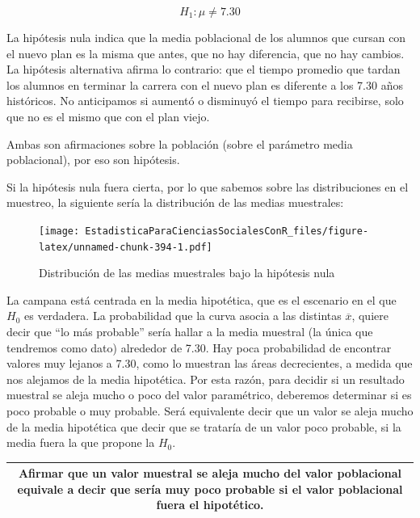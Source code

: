 \documentclass[]{book}
\begin{document}
\[H_{1}:\mu \neq 7.30\]

La hipótesis nula indica que la media poblacional de los alumnos que
cursan con el nuevo plan es la misma que antes, que no hay diferencia,
que no hay cambios. La hipótesis alternativa afirma lo contrario: que el tiempo promedio que tardan los alumnos en terminar la carrera con el
nuevo plan es diferente a los 7.30 años históricos. No anticipamos si aumentó o disminuyó el tiempo para recibirse, solo que no es el mismo que con el plan viejo.

Ambas son afirmaciones sobre la población (sobre el parámetro media poblacional), por eso son hipótesis.

Si la hipótesis nula fuera cierta, por lo que sabemos sobre las
distribuciones en el muestreo, la siguiente sería la distribución de las medias muestrales:

\begin{figure}
\centering
\texttt{[image: EstadisticaParaCienciasSocialesConR\_files/figure-latex/unnamed-chunk-394-1.pdf]}
\caption{\label{fig:unnamed-chunk-394}Distribución de las medias muestrales bajo la hipótesis nula}
\end{figure}

La campana está centrada en la media hipotética, que es el escenario en el que \(H_{0}\) es verdadera. La probabilidad que la curva asocia a las distintas \(\overline{x}\), quiere decir que ``lo más probable'' sería hallar a la media muestral (la única que tendremos como dato) alrededor de 7.30. Hay poca probabilidad de encontrar valores muy
lejanos a 7.30, como lo muestran las áreas decrecientes, a medida que
nos alejamos de la media hipotética. Por esta razón, para decidir si un
resultado muestral se aleja mucho o poco del valor paramétrico,
deberemos determinar si es poco probable o muy probable. Será
equivalente decir que un valor se aleja mucho de la media hipotética que decir que se trataría de un valor poco probable, si la media fuera la que propone la \(H_{0}\).

\begin{longtable}[]{@{}c@{}}
\toprule
\endhead
\begin{minipage}[t]{0.97\columnwidth}\centering
Afirmar que un valor muestral \textbf{se aleja mucho del valor poblacional} equivale a decir que \textbf{sería muy poco probable si el valor poblacional fuera el hipotético}.\strut
\end{minipage}\tabularnewline
\bottomrule
\end{longtable}
\end{document}
